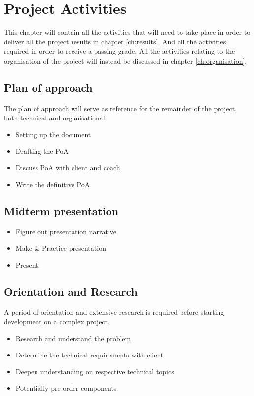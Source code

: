 \chapter{Project Activities}
This chapter will contain all the activities that will need to take place in order to deliver all the project results in chapter \ref{ch:results}. And all the activities required in order to receive a passing grade. All the activities relating to the organisation of the project will instead be discussed in chapter \ref{ch:organisation}.

\section{Plan of approach}
The plan of approach will serve as reference for the remainder of the project, both technical and organisational.
\begin{itemize}
    \item Setting up the document
    \item Drafting the PoA
    \item Discuss PoA with client and coach
    \item Write the definitive PoA
\end{itemize}

\section{Midterm presentation}
\begin{itemize}
    \item Figure out presentation narrative
    \item Make \& Practice presentation
    \item Present.
\end{itemize}

\section{Orientation and Research}
A period of orientation and extensive research is required before starting development on a complex project. 
\begin{itemize}
    \item Research and understand the problem
    \item Determine the technical requirements with client
    \item Deepen understanding on respective technical topics
    \item Potentially pre order components
\end{itemize}

